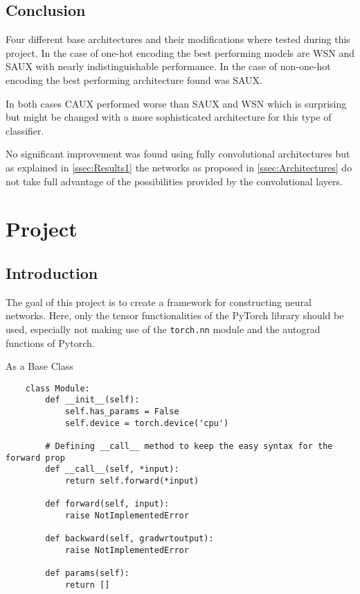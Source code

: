 \documentclass[11pt,english]{article}
\begin{document}
	\subsection{Conclusion}
	Four different base architectures and their modifications where tested during this project. In the case of one-hot encoding the best performing models are WSN and SAUX with nearly indistinguishable performance. In the case of non-one-hot encoding the best performing architecture found was SAUX. 
	
	In both cases CAUX performed worse than SAUX and WSN which is surprising but might be changed with a more sophisticated architecture for this type of classifier.
	
	No significant improvement was found using fully convolutional architectures but as explained in \cref{ssec:Results1} the networks as proposed in \cref{ssec:Architectures} do not take full advantage of the possibilities provided by the convolutional layers.

	\section{Project} \label{sec:Proj2}
	\vspace{-10pt}
	
	\subsection{Introduction}
	The goal of this project is to create a framework for constructing neural networks. Here, only the tensor functionalities of the PyTorch library should be used, especially not making use of the \lstinline|torch.nn| module and the autograd functions of Pytorch.
	
	As a Base Class 
	
	\begin{lstlisting}
	class Module:
		def __init__(self):
			self.has_params = False
			self.device = torch.device('cpu')
		
		# Defining __call__ method to keep the easy syntax for the forward prop
		def __call__(self, *input):
			return self.forward(*input)
		
		def forward(self, input):
			raise NotImplementedError
		
		def backward(self, gradwrtoutput):
			raise NotImplementedError
		
		def params(self):
			return []
	\end{lstlisting}
	
\end{document}
